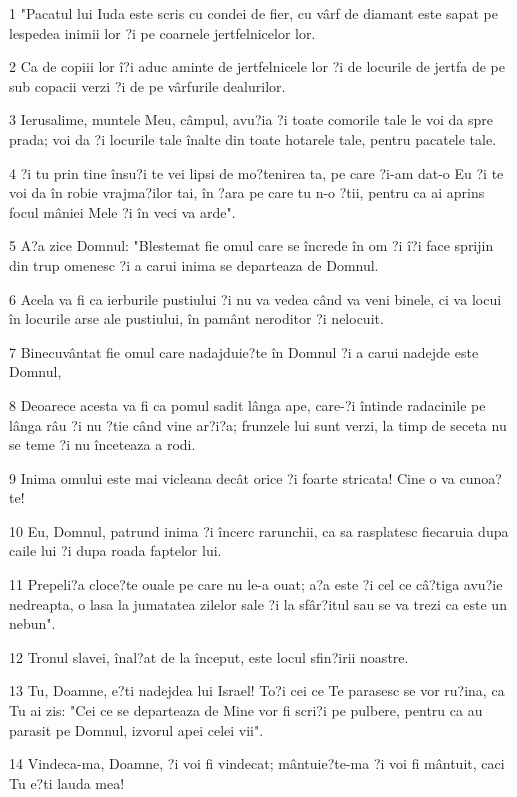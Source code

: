 \par 1 "Pacatul lui Iuda este scris cu condei de fier, cu vârf de diamant este sapat pe lespedea inimii lor ?i pe coarnele jertfelnicelor lor.
\par 2 Ca de copiii lor î?i aduc aminte de jertfelnicele lor ?i de locurile de jertfa de pe sub copacii verzi ?i de pe vârfurile dealurilor.
\par 3 Ierusalime, muntele Meu, câmpul, avu?ia ?i toate comorile tale le voi da spre prada; voi da ?i locurile tale înalte din toate hotarele tale, pentru pacatele tale.
\par 4 ?i tu prin tine însu?i te vei lipsi de mo?tenirea ta, pe care ?i-am dat-o Eu ?i te voi da în robie vrajma?ilor tai, în ?ara pe care tu n-o ?tii, pentru ca ai aprins focul mâniei Mele ?i în veci va arde".
\par 5 A?a zice Domnul: "Blestemat fie omul care se încrede în om ?i î?i face sprijin din trup omenesc ?i a carui inima se departeaza de Domnul.
\par 6 Acela va fi ca ierburile pustiului ?i nu va vedea când va veni binele, ci va locui în locurile arse ale pustiului, în pamânt neroditor ?i nelocuit.
\par 7 Binecuvântat fie omul care nadajduie?te în Domnul ?i a carui nadejde este Domnul,
\par 8 Deoarece acesta va fi ca pomul sadit lânga ape, care-?i întinde radacinile pe lânga râu ?i nu ?tie când vine ar?i?a; frunzele lui sunt verzi, la timp de seceta nu se teme ?i nu înceteaza a rodi.
\par 9 Inima omului este mai vicleana decât orice ?i foarte stricata! Cine o va cunoa?te!
\par 10 Eu, Domnul, patrund inima ?i încerc rarunchii, ca sa rasplatesc fiecaruia dupa caile lui ?i dupa roada faptelor lui.
\par 11 Prepeli?a cloce?te ouale pe care nu le-a ouat; a?a este ?i cel ce câ?tiga avu?ie nedreapta, o lasa la jumatatea zilelor sale ?i la sfâr?itul sau se va trezi ca este un nebun".
\par 12 Tronul slavei, înal?at de la început, este locul sfin?irii noastre.
\par 13 Tu, Doamne, e?ti nadejdea lui Israel! To?i cei ce Te parasesc se vor ru?ina, ca Tu ai zis: "Cei ce se departeaza de Mine vor fi scri?i pe pulbere, pentru ca au parasit pe Domnul, izvorul apei celei vii".
\par 14 Vindeca-ma, Doamne, ?i voi fi vindecat; mântuie?te-ma ?i voi fi mântuit, caci Tu e?ti lauda mea!
